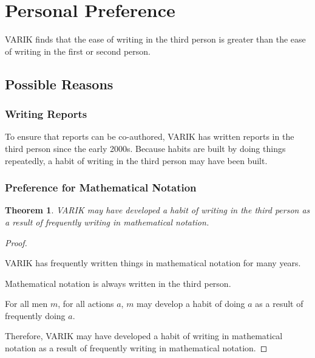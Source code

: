 \documentclass{article}
\newtheorem{thm}{Theorem}
\begin{document}
	\section{Personal Preference}
		VARIK finds that the ease of writing in the third person is greater
		than the ease of writing in the first or second person.
		\subsection{Possible Reasons}
			\subsubsection{Writing Reports}
				To ensure that reports can be co-authored, VARIK has written
				reports in the third person since the early 2000s.  Because
				habits are built by doing things repeatedly, a habit of writing
				in the third person may have been built.
			\subsubsection{Preference for Mathematical Notation}
				\begin{thm}
					VARIK may have developed a habit of writing in the third
					person as a result of frequently writing in mathematical
					notation.
				\end{thm}
				\begin{proof}
					${ }$

					VARIK has frequently written things in mathematical notation
					for many years.

					Mathematical notation is always written in the third person.

					For all men $m$, for all actions $a$, $m$ may develop a habit
					of doing $a$ as a result of frequently doing $a$.

					Therefore, VARIK may have developed a habit of writing in
					mathematical notation as a result of frequently writing in
					mathematical notation.
				\end{proof}
\end{document}
